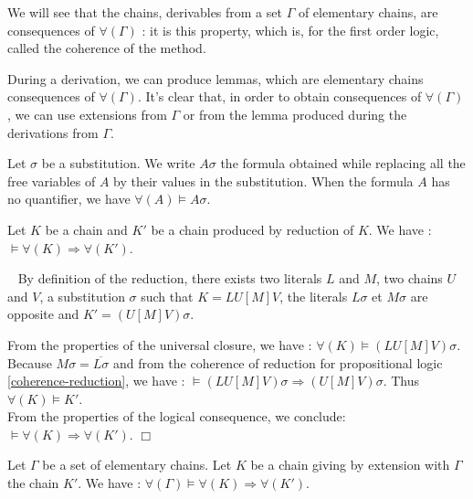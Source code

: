 \documentclass{article}
\newenvironment{preuve}{\noindent {\em Proof :}\ }{{\hfill
    $\Box$}\vspace{.5pc}} \newcommand{\sg}{\!\!<\!\!}
\begin{document}
We will see that the chains, derivables from a set $\Gamma$ of elementary chains, are consequences of $\forall(\Gamma)$ : it is
this property, which is, for the first order logic, called the coherence of the method.

During a derivation, we can produce lemmas, which are elementary chains consequences of  $\forall(\Gamma)$.
It's clear that, in order to obtain consequences of $\forall(\Gamma)$, we can use extensions from $\Gamma$ or from
the lemma produced during the derivations from $\Gamma$.

Let $\sigma$ be a substitution. We write $A\sigma$ the formula obtained while replacing all the free variables of $A$
by their values in the substitution. When the formula $A$ has no quantifier, we have  $\forall(A) \models A\sigma$.

\begin{lemme}\label{coherence-reduction-1}
Let $K$ be a chain and $K'$ be a chain produced by reduction of $K$.
We have : $\models \forall(K) \Rightarrow \forall(K')$.
\end{lemme}

\begin{preuve}
By definition of the reduction, there exists two literals $L$ and $M$, two chains $U$ and $V$, a substitution $\sigma$
such that 
 $K = LU[M]V$, the literals  $L\sigma$ et $M\sigma$ are opposite  and
$K' = (U[M]V)\sigma$.

From the properties of the universal closure, we have : $\forall(K) \models (LU[M]V)\sigma $.\\
Because $M\sigma =\overline{L\sigma}$ and
from the coherence of reduction for propositional logic \ref{coherence-reduction}, 
 we have : $\models (LU[M]V)\sigma \Rightarrow (U[M]V)\sigma$.
Thus $\forall(K) \models K'$. \\
From the properties of the logical consequence, we conclude: $\models \forall(K) \Rightarrow \forall(K')$.
\end{preuve}



\begin{lemme}\label{coherence-expansion-1}
Let $\Gamma$ be a set of elementary chains. Let $K$ be a chain giving by extension with $\Gamma$ the chain $K'$.
We have : $\forall(\Gamma) \models \forall(K) \Rightarrow \forall(K')$.
\end{lemme}
\end{document}
